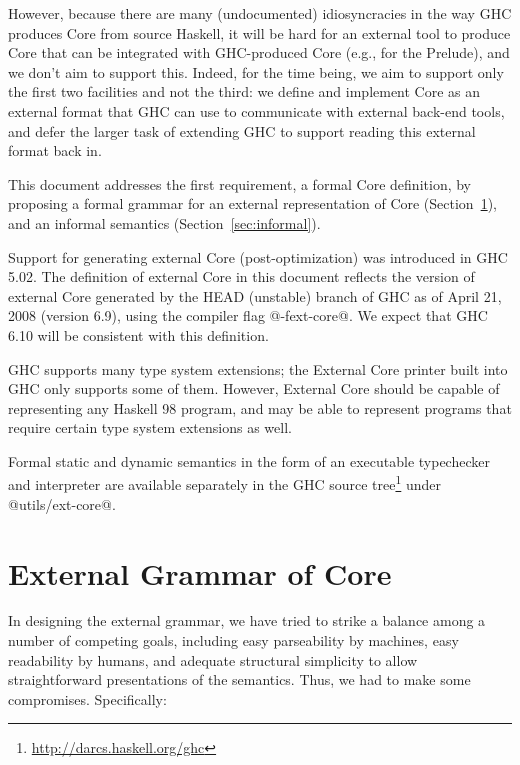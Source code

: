 \documentclass[10pt]{article}
\begin{document}
However, because there are many (undocumented)
idiosyncracies in the way GHC produces Core from source Haskell, it will be hard
for an external tool to produce Core that can be integrated with GHC-produced Core 
(e.g., for the Prelude), and we don't aim to support this. Indeed, for the time being, we aim to support only the first two facilities and not the third: we define and implement Core as an external format that GHC can use to communicate with external back-end tools, and defer the larger task of extending GHC to support reading this external format back in.

This document addresses the first requirement, a formal Core definition,
by proposing  a formal grammar for an external representation of Core
(Section~\ref{sec:external}), and 
an informal semantics (Section~\ref{sec:informal}).

Support for generating external Core (post-optimization) was introduced in
GHC 5.02.  The definition of external Core in this document reflects the version of
external Core generated by the HEAD (unstable) branch of GHC as of April 21, 2008 (version 6.9), using the compiler flag
@-fext-core@. We expect that GHC 6.10 will be consistent with this definition.

GHC supports many type system extensions; the External Core printer built into GHC only supports some of them. However, External Core should be capable of representing any Haskell 98 program, and may be able to represent programs that require certain type system extensions as well.
 
Formal static and dynamic semantics in the form of an executable typechecker and interpreter
are available separately in the GHC source tree\footnote{\url{http://darcs.haskell.org/ghc}} under @utils/ext-core@.

\section{External Grammar of Core}
\label{sec:external}

In designing the external grammar, we have tried to strike a balance among
a number of competing goals, including easy parseability by machines,
easy readability by humans, and adequate structural simplicity to 
allow straightforward presentations of the semantics. Thus, we had to make some compromises. Specifically:
\end{document}
